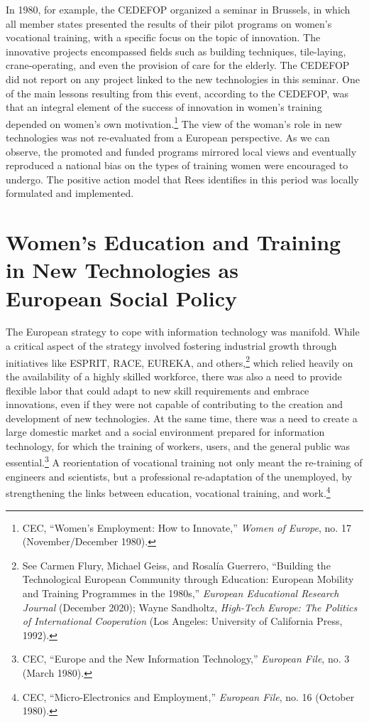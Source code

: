 \documentclass{tufte-handout}
\begin{document}
In 1980, for example, the CEDEFOP organized a seminar in Brussels, in
which all member states presented the results of their pilot programs on
women's vocational training, with a specific focus on the topic of
innovation. The innovative projects encompassed fields such as building
techniques, tile-laying, crane-operating, and even the provision of care
for the elderly. The CEDEFOP did not report on any project linked to the
new technologies in this seminar. One of the main lessons resulting from
this event, according to the CEDEFOP, was that an integral element of
the success of innovation in women's training depended on women's own
motivation.\footnote{CEC, ``Women's Employment: How to Innovate,''
  \emph{Women of Europe}, no. 17 (November/December 1980).} The view of
the woman's role in new technologies was not re-evaluated from a
European perspective. As we can observe, the promoted and funded
programs mirrored local views and eventually reproduced a national bias
on the types of training women were encouraged to undergo. The positive
action model that Rees identifies in this period was locally formulated
and implemented.



\hypertarget{womens-education-and-training-in-new-technologies-as-european-social-policy}{%
\section{Women's Education and Training in New Technologies as\\\noindent
European Social
Policy}\label{womens-education-and-training-in-new-technologies-as-european-social-policy}}

The European strategy to cope with information technology was manifold.
While a critical aspect of the strategy involved fostering industrial
growth through initiatives like ESPRIT, RACE, EUREKA, and
others,\footnote{See Carmen Flury, Michael Geiss, and Rosalía Guerrero,
  ``Building the Technological European Community through Education:
  European Mobility and Training Programmes in the 1980s,''
  \emph{European Educational Research Journal} (December 2020); Wayne
  Sandholtz, \emph{High-Tech Europe: The Politics of International
  Cooperation} (Los Angeles: University of California Press, 1992).}
which relied heavily on the availability of a highly skilled workforce,
there was also a need to provide flexible labor that could adapt to new
skill requirements and embrace innovations, even if they were not
capable of contributing to the creation and development of new
technologies. At the same time, there was a need to create a large
domestic market and a social environment prepared for information
technology, for which the training of workers, users, and the general
public was essential.\footnote{CEC, ``Europe and the New Information
  Technology,'' \emph{European File}, no. 3 (March 1980).} A
reorientation of vocational training not only meant the re-training of
engineers and scientists, but a professional re-adaptation of the
unemployed, by strengthening the links between education, vocational
training, and work.\footnote{CEC, ``Micro-Electronics and Employment,''
  \emph{European File}, no. 16 (October 1980).}
\end{document}
